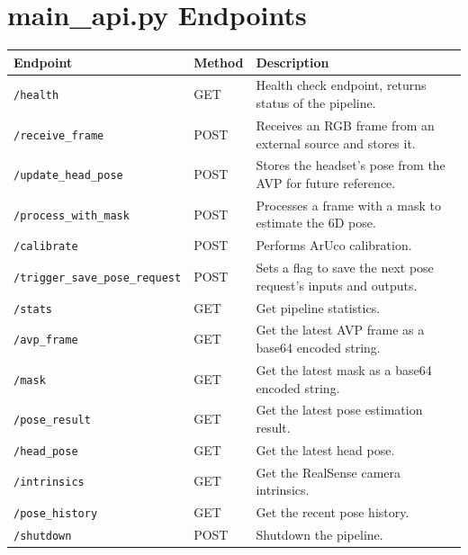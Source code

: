 \documentclass{article}
\begin{document}
\section*{main\_api.py Endpoints}

\begin{longtable}{| >{\raggedright\arraybackslash}p{} | >{\raggedright\arraybackslash}p{} | >{\raggedright\arraybackslash}p{} |}
\hline
\textbf{Endpoint} & \textbf{Method} & \textbf{Description} \\
\hline
\endhead

\texttt{/health} & GET & Health check endpoint, returns status of the pipeline. \\
\hline
\texttt{/receive\_frame} & POST & Receives an RGB frame from an external source and stores it. \\
\hline
\texttt{/update\_head\_pose} & POST & Stores the headset's pose from the AVP for future reference. \\
\hline
\texttt{/process\_with\_mask} & POST & Processes a frame with a mask to estimate the 6D pose. \\
\hline
\texttt{/calibrate} & POST & Performs ArUco calibration. \\
\hline
\texttt{/trigger\_save\_pose\_request} & POST & Sets a flag to save the next pose request's inputs and outputs. \\
\hline
\texttt{/stats} & GET & Get pipeline statistics. \\
\hline
\texttt{/avp\_frame} & GET & Get the latest AVP frame as a base64 encoded string. \\
\hline
\texttt{/mask} & GET & Get the latest mask as a base64 encoded string. \\
\hline
\texttt{/pose\_result} & GET & Get the latest pose estimation result. \\
\hline
\texttt{/head\_pose} & GET & Get the latest head pose. \\
\hline
\texttt{/intrinsics} & GET & Get the RealSense camera intrinsics. \\
\hline
\texttt{/pose\_history} & GET & Get the recent pose history. \\
\hline
\texttt{/shutdown} & POST & Shutdown the pipeline. \\
\hline
\end{longtable}
\end{document}
